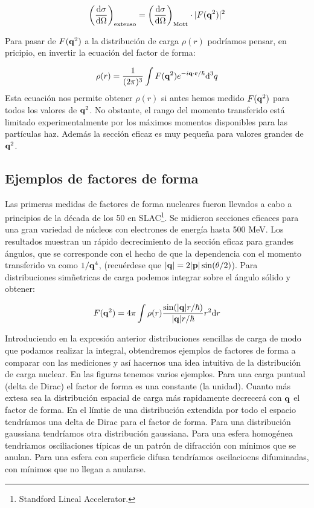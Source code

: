 \begin{equation}
	\left( \frac{\mathrm{d} \sigma}{\mathrm{d} \Omega} \right)_{\text{extenso}} = \left( \frac{\mathrm{d} \sigma}{\mathrm{d} \Omega} \right)_{\text{Mott}} \cdot |F(\mathbf{q}^2)|^2
\end{equation} 

Para pasar de $F(\mathbf{q}^2)$ a la distribución de carga $\rho(r)$ podríamos pensar, en pricipio, en invertir la ecuación del factor de forma:

\begin{equation}
    \rho(r)=\frac{1}{(2\pi)^3} \int F(\mathbf{q}^2) e^{-i \mathbf{q} \cdot \mathbf{r}/\hbar} \mathrm{d}^3 q
\end{equation}
Esta ecuación nos permite obtener $\rho(r)$ si antes hemos medido $F(\mathbf{q}^2)$ para todos los valores de $\mathbf{q}^2$. No obstante, el rango del momento transferido está limitado experimentalmente por los máximos momentos disponibles para las partículas haz. Además la sección eficaz es muy pequeña para valores grandes de $\mathbf{q}^2$. 

\subsection{Ejemplos de factores de forma}

Las primeras medidas de factores de forma nucleares fueron llevados a cabo a principios de la década de los 50 en SLAC\footnote{Standford Lineal Accelerator.}. Se midieron secciones eficaces para una gran variedad de núcleos con electrones de energía hasta 500 MeV. Los resultados muestran un rápido decrecimiento de la sección eficaz para grandes ángulos, que se corresponde con el hecho de que la dependencia con el momento transferido va como $1/\mathbf{q}^4$, (recuérdese que $|\mathbf{q}|=2|\mathbf{p}| \sin (\theta /2)$). Para distribuciones simñetricas de carga podemos integrar sobre el ángulo sólido y obtener:

\begin{equation}
	F(\mathbf{q}^2) = 4 \pi \int \rho (r) \frac{\sin (|\mathbf{q}|r/\hbar)}{ |\mathbf{q}| r / \hbar} r^2 \mathrm{d} r
\end{equation}

Introduciendo en la expresión anterior distribuciones sencillas de carga de modo que podamos realizar la integral, obtendremos ejemplos de factores de forma a comparar con las mediciones y así hacernos una idea intuitiva de la distribución de carga nuclear. En las figuras tenemos varios ejemplos. Para una carga puntual (delta de Dirac) el factor de forma es una constante (la unidad). Cuanto más extesa sea la distribución espacial de carga más rapidamente decrecerá con $\mathbf{q}$ el factor de forma. En el límtie de una distribución extendida por todo el espacio tendríamos una delta de Dirac para el factor de forma. Para una distribución gaussiana tendríamos otra distribución gaussiana. Para una esfera homogénea tendriamos osciliaciones típicas de un patrón de difracción con mínimos que se anulan. Para una esfera con superficie difusa tendríamos oscilacioens difuminadas, con mínimos que no llegan a anularse. \\

